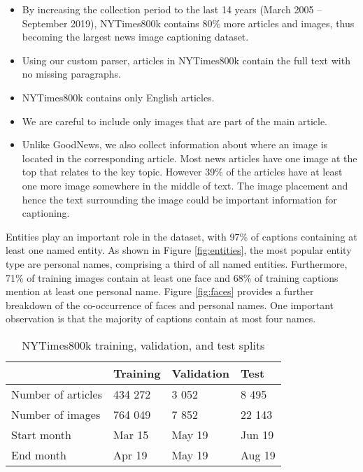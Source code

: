 \documentclass[10pt,twocolumn,letterpaper]{article}
\begin{document}
\begin{itemize}
   \item By increasing the collection period to the last 14 years (March 2005
   -- September 2019), NYTimes800k contains 80\% more articles and images, thus
   becoming the largest news image captioning dataset.
   \item Using our custom parser, articles in NYTimes800k contain the full text
   with no missing paragraphs.
   \item NYTimes800k contains only English articles.
   \item We are careful to include only images that are part of the main
   article.
   \item Unlike GoodNews, we also collect information about where an image is
   located in the corresponding article. Most news articles have one image at
   the top that relates to the key topic. However 39\% of the articles have at
   least one more image somewhere in the middle of text. The image placement
   and hence the text surrounding the image could be important information for
   captioning.
\end{itemize}

Entities play an important role in the dataset, with 97\% of captions
containing at least one named entity. As shown in Figure \ref{fig:entities},
the most popular entity type are personal names, comprising a third of all
named entities. Furthermore, 71\% of training images contain at least one face
and 68\% of training captions mention at least one personal name. Figure
\ref{fig:faces} provides a further breakdown of the co-occurrence of faces and
personal names. One important observation is that the majority of captions
contain at most four names.


\begin{table}[t]
	\caption {NYTimes800k training, validation, and test splits}
	\label{tab:splits}
	\centering
	\begin{tabularx}{\linewidth}{lXXX}
		\toprule
		  & Training  &   Validation & Test \\
		\midrule
      Number of articles & 434 272 & 3 052 & 8 495 \\
      Number of images  & 764 049 & 7 852 & 22 143 \\
      Start month & Mar 15 & May 19 & Jun 19 \\
      End month & Apr 19 & May 19 & Aug 19 \\
		\bottomrule
	\end{tabularx}
\end{table}
\end{document}
